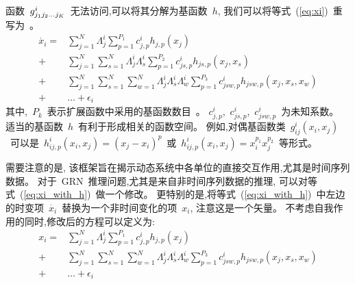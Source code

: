 函数~$g^i_{j_{1}j_{2}\ldots\\j_{K}}$~无法访问,可以将其分解为基函数~$h$,
我们可以将等式~(\ref{eq:xi})~重写为~\cite{casadiego2017model}。
\begin{equation}
\label{eq:xi_with_h}
\begin{split}
\dot{x_i} =  &\sum_{j=1}^{N} \Lambda^i_{j} \sum_{p=1}^{P_1} c^i_{j,p}h_{j,p}(x_j) \\
+ &  \sum_{j=1}^{N} \sum_{s=1}^{N}\Lambda^i_{j}\Lambda^i_{s} \sum_{p=1}^{P_2} c^i_{js,p}h_{js,p}(x_j,x_s) \\
                             + &\sum_{j=1}^{N} \sum_{s=1}^{N} \sum_{w=1}^{N}\Lambda^i_{j}\Lambda^i_{s}\Lambda^i_{w} \sum_{p=1}^{P_3} c^i_{jsw,p}h_{jsw,p}(x_j,x_s,x_w)\\
                             + &\ldots + \epsilon_{i} 
\end{split}
\end{equation}
其中,~$P_k$~表示扩展函数中采用的基函数数目~\cite{friedman2001elements}。
$c^i_{j,p}$,~$c^i_{js,p}$,~$c^i_{jsw,p}$~为未知系数。
适当的基函数~$h$~有利于形成相关的函数空间。
例如,对偶基函数类~$g^i_{ij}(x_i,x_j)$~可以是~$h^i_{ij,p}(x_i,x_j)=(x_j-x_i)^p$~或~$h^i_{ij,p}(x_i,x_j)=x^{p_{1}}_i x^{p_{2}}_j$~等形式。

需要注意的是, 该框架旨在揭示动态系统中各单位的直接交互作用,尤其是时间序列数据。
对于~GRN~推理问题,尤其是来自非时间序列数据的推理,
可以对等式~(\ref{eq:xi_with_h})~做一个修改。
更特别的是,将等式~(\ref{eq:xi_with_h})~中左边的时变项~$\dot{x_i}$~替换为一个非时间变化的项~$x_i$, 注意这是一个矢量。
不考虑自我作用的同时,修改后的方程可以定义为:
\begin{equation}
\label{eq:x_i_fs}
\begin{split}
   x_i = &\sum_{j=1}^{N} \Lambda^i_{j} \sum_{p=1}^{P_1} c^i_{j,p}h_{j,p}(x_j)\\  
       + &\sum_{j=1}^{N} \sum_{s=1}^{N} \sum_{w=1}^{N}\Lambda^i_{j}\Lambda^i_{s}\Lambda^i_{w} \sum_{p=1}^{P_3} c^i_{jsw,p}h_{jsw,p}(x_j,x_s,x_w)\\
       +&\ldots + \epsilon_{i}
   \end{split}
\end{equation}


